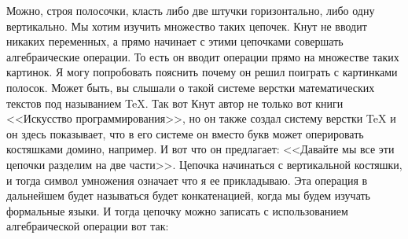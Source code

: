 \documentclass[russian]{lecture-notes}
\theoremstyle{definition}
\begin{document}
\begin{enumerate}
		Можно, строя полосочки, класть либо две штучки горизонтально, либо одну вертикально. Мы хотим изучить множество таких цепочек. Кнут не вводит никаких переменных, а прямо начинает с этими цепочками совершать алгебраические операции. То есть он вводит операции прямо на множестве таких картинок. Я могу попробовать пояснить почему он решил поиграть с картинками полосок. Может быть, вы слышали о такой системе верстки математических текстов под называнием TeX. Так вот Кнут автор не только вот книги <<Искусство программирования>>, но он также создал систему верстки TeX и он здесь показывает, что в его системе он вместо букв может оперировать костяшками домино, например. И вот что он предлагает: <<Давайте мы все эти цепочки разделим на две части>>. Цепочка начинаться с вертикальной костяшки, и тогда символ умножения означает что я ее прикладываю. Эта операция в дальнейшем будет называться будет конкатенацией, когда мы будем изучать формальные языки. И тогда цепочку можно записать с использованием алгебраической операции вот так:
		
		\begin{figure}[H]
			\centering
\end{figure}
\end{enumerate}
\end{document}

